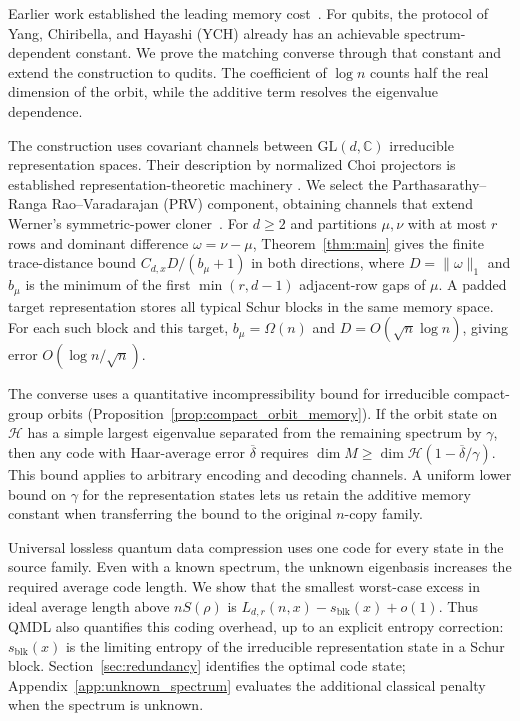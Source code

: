 \documentclass[a4paper,onecolumn,11pt]{quantumarticle}
\begin{document}
Earlier work established the leading memory cost~\cite{yang2016optimal,yang2018compression}. For qubits, the protocol of Yang, Chiribella, and Hayashi (YCH) already has an achievable spectrum-dependent constant. We prove the matching converse through that constant and extend the construction to qudits. The coefficient of $\log n$ counts half the real dimension of the orbit, while the additive term resolves the eigenvalue dependence.

The construction uses covariant channels between
$\mathrm{GL}(d,\mathbb C)$ irreducible representation spaces.
Their description by normalized Choi projectors is established
representation-theoretic machinery
\cite{gschwendtner2021programmability,lee2022quantum,aschieri2024equivariant}.
We select the Parthasarathy--Ranga Rao--Varadarajan (PRV) component,
obtaining channels that extend Werner's symmetric-power
cloner~\cite{werner1998optimal}. For $d\ge2$ and partitions
$\mu,\nu$ with at most $r$ rows and dominant difference
$\omega=\nu-\mu$, Theorem~\ref{thm:main} gives
the finite trace-distance bound $C_{d,x}D/(b_\mu+1)$ in both
directions, where $D=\|\omega\|_1$ and $b_\mu$ is the minimum of
the first $\min(r,d-1)$ adjacent-row gaps of $\mu$.
A padded target representation stores all typical Schur blocks in
the same memory space. For each such block and this target,
$b_\mu=\Omega(n)$ and $D=O(\sqrt n\log n)$, giving error
$O(\log n/\sqrt n)$.

The converse uses a quantitative incompressibility bound for
irreducible compact-group orbits
(Proposition~\ref{prop:compact_orbit_memory}). If the orbit state
on $\mathcal H$ has a simple largest eigenvalue separated from the
remaining spectrum by $\gamma$, then any code with Haar-average
error $\overline\delta$ requires
$\dim M\ge\dim\mathcal H(1-\overline\delta/\gamma)$.
This bound applies to arbitrary encoding and decoding channels.
A uniform lower bound on $\gamma$ for the representation states
lets us retain the additive memory constant when transferring
the bound to the original $n$-copy family.

Universal lossless quantum data compression uses one code for every
state in the source family. Even with a known spectrum, the
unknown eigenbasis increases the required average code length.
We show that the smallest worst-case excess in ideal average length
above $nS(\rho)$ is $L_{d,r}(n,x)-s_{\mathrm{blk}}(x)+o(1)$.
Thus QMDL also quantifies this coding overhead, up to an explicit
entropy correction: $s_{\mathrm{blk}}(x)$ is the limiting entropy
of the irreducible representation state in a Schur block.
Section~\ref{sec:redundancy} identifies the optimal code state;
Appendix~\ref{app:unknown_spectrum} evaluates the additional
classical penalty when the spectrum is unknown.
\end{document}
